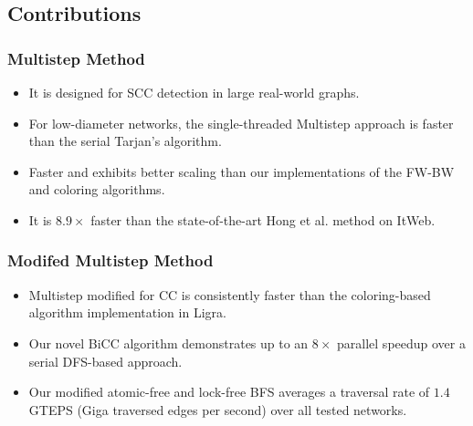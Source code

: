 \subsection{Contributions}
\begin{frame}
	\frametitle{Multistep Method}
	\begin{itemize}
		\setlength\itemsep{1em}
		\item It is designed for SCC detection in large real-world graphs.
		\item For low-diameter networks, the single-threaded Multistep 
			approach is faster than the serial Tarjan's algorithm.
		\item Faster and exhibits better scaling than our
			implementations of the FW-BW and coloring algorithms.
		\item It is $8.9\times$ faster than the state-of-the-art Hong 
			et al. method on ItWeb.
	\end{itemize}
\end{frame}

\begin{frame}
	\frametitle{Modifed Multistep Method}
	\begin{itemize}
		\setlength\itemsep{1em}
		\item Multistep modified for CC is consistently faster than the
			coloring-based algorithm implementation in Ligra.
		\item Our novel BiCC algorithm demonstrates up to an $8\times$ 
			parallel speedup over a serial DFS-based approach.
		\item Our modified atomic-free and lock-free BFS averages a
			traversal rate of $1.4$ GTEPS (Giga traversed edges per
			second) over all tested networks.
	\end{itemize}
\end{frame}